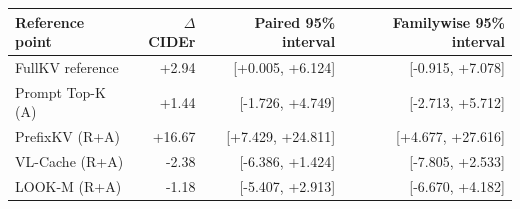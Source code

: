 \begin{tabular}{lrrr}
\toprule
Reference point & $\Delta$CIDEr & Paired 95\% interval & Familywise 95\% interval\\
\midrule
FullKV reference & +2.94 & [+0.005, +6.124] & [-0.915, +7.078]\\
Prompt Top-K (A) & +1.44 & [-1.726, +4.749] & [-2.713, +5.712]\\
PrefixKV (R+A) & +16.67 & [+7.429, +24.811] & [+4.677, +27.616]\\
VL-Cache (R+A) & -2.38 & [-6.386, +1.424] & [-7.805, +2.533]\\
LOOK-M (R+A) & -1.18 & [-5.407, +2.913] & [-6.670, +4.182]\\
\bottomrule
\end{tabular}
